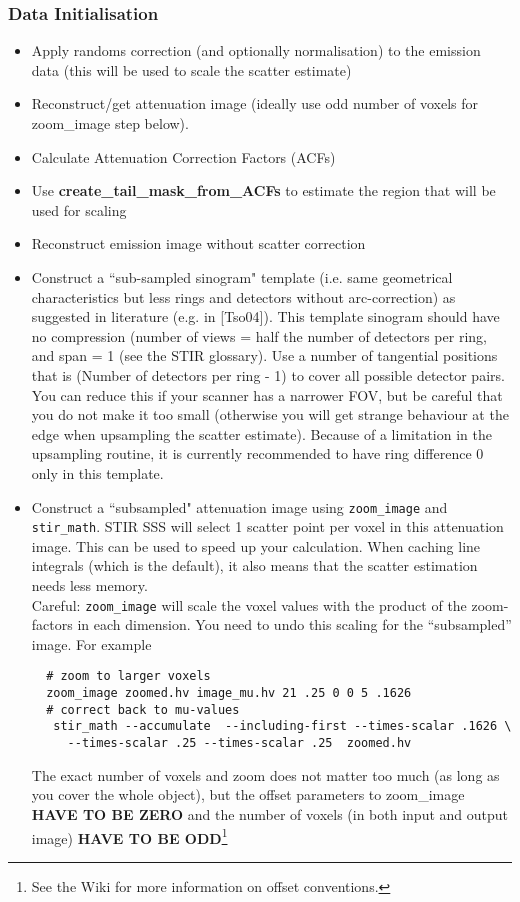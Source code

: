 \documentclass{article}
\begin{document}
{{{\subsubsection{Data Initialisation \label{sec:scatter_data_initialisation}}
\begin{itemize}
\item Apply randoms correction (and optionally normalisation) to the emission data (this will be used to scale the scatter estimate)
\item Reconstruct/get attenuation image (ideally use odd number of voxels for zoom\_image step below).
\item Calculate Attenuation Correction Factors (ACFs)
\item Use \textbf{create\_tail\_mask\_from\_ACFs} to estimate the region that will be used for scaling
\item Reconstruct emission image without scatter correction
\item Construct a ``sub-sampled sinogram" template (i.e. same geometrical characteristics but
less rings and detectors without arc-correction) as suggested in literature (e.g. in [Tso04]). This template
sinogram should have no compression (number of views = half the number of detectors per ring, and span = 1 (see the
STIR glossary). 
Use a number of tangential positions that is (Number of detectors per ring - 1) to cover all possible
detector pairs. You can reduce this if your scanner has a narrower FOV, but be careful that you do not 
make it too small (otherwise you will get strange behaviour at the edge when upsampling the scatter estimate).
Because of a limitation in the upsampling routine, it is currently recommended to have ring difference 0 only in this
template.
\item Construct a ``subsampled" attenuation image using \texttt{zoom\_image} and \texttt{stir\_math}. 
 STIR SSS will select 1 scatter point per voxel in this attenuation image. This can be used to speed up your
 calculation. When caching line integrals (which is the default), it also means that the scatter estimation
 needs less memory.\\
 Careful: \texttt{zoom\_image} will scale the voxel values with the product of the zoom-factors in each dimension. 
 You need to undo this scaling for the ``subsampled'' image.    
 For example
 \begin{verbatim}
  # zoom to larger voxels 
  zoom_image zoomed.hv image_mu.hv 21 .25 0 0 5 .1626
  # correct back to mu-values
   stir_math --accumulate  --including-first --times-scalar .1626 \
     --times-scalar .25 --times-scalar .25  zoomed.hv
 \end{verbatim}
  The exact number of voxels and zoom does not matter too much (as long as you cover the 
  whole object), but the offset parameters to zoom\_image
  \textbf{HAVE TO BE ZERO} and the number of voxels (in both input and output image)
  \textbf{HAVE TO BE ODD}\footnote{See the Wiki for more information on offset conventions.}
\end{itemize}

}}}
\end{document}

